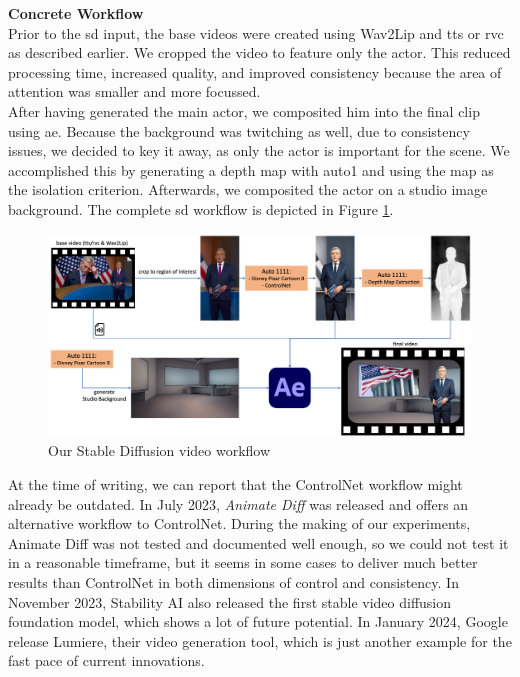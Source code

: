 \documentclass[
  a4paper,  %
  twoside,  %
  bibliography=totoc,
  headsepline,
  cleardoublepage=empty,
  parskip=half,
  draft=false
]{scrbook}
\begin{document}
\textbf{Concrete Workflow} \\
Prior to the \gls{sd} input, the base videos were created using Wav2Lip and \gls{tts} or \gls{rvc} as described earlier. We cropped the video to feature only the actor. This reduced processing time, increased quality, and improved consistency because the area of attention was smaller and more focussed. \\
After having generated the main actor, we composited him into the final clip using \gls{ae}. Because the background was  twitching as well, due to consistency issues, we decided to key it away, as only the actor is important for the scene. We accomplished this by generating a depth map with \gls{auto1} and using the map as the isolation criterion. Afterwards, we composited the actor on a studio image background. The complete \gls{sd} workflow is depicted in Figure \ref{fig:sd-full-workflow}. 

\begin{figure}[h]
  \centering
  \includegraphics[width=1\textwidth]{./graphics/images/diffusion/sd-workflow.png}
  \caption{Our Stable Diffusion video workflow}
  \label{fig:sd-full-workflow}
\end{figure}

At the time of writing, we can report that the ControlNet workflow might already be outdated. In July 2023, \textit{Animate Diff} was released and offers an alternative workflow to ControlNet. During the making of our experiments, Animate Diff was not tested and documented well enough, so we could not test it in a reasonable timeframe, but it seems in some cases to deliver much better results than ControlNet in both dimensions of control and consistency. In November 2023, Stability AI also released the first stable video diffusion foundation model, which shows a lot of future potential. In January 2024, Google release Lumiere, their video generation tool, which is just another example for the fast pace of current innovations.
\end{document}
